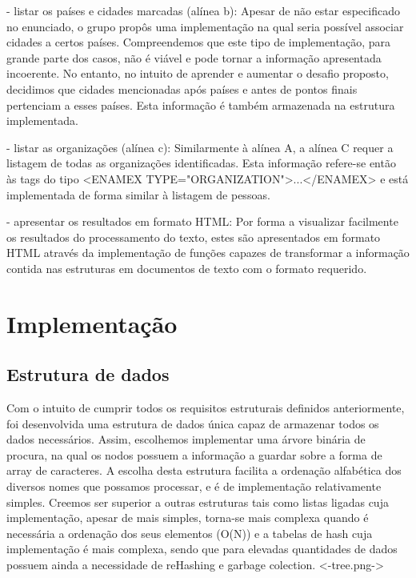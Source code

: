 - listar os países e cidades marcadas (alínea b):
	Apesar de não estar especificado no enunciado, o grupo propôs uma implementação na qual seria possível associar cidades a certos países. Compreendemos que este tipo de implementação, para grande parte dos casos, não é viável e pode tornar a informação apresentada incoerente. No entanto, no intuito de aprender e aumentar o desafio proposto, decidimos que cidades mencionadas após países e antes de pontos finais pertenciam a esses países. Esta informação é também armazenada na estrutura implementada.

- listar as organizações (alínea c):
	Similarmente à alínea A, a alínea C requer a listagem de todas as organizações identificadas. Esta informação refere-se então às tags do tipo <ENAMEX TYPE="ORGANIZATION">...</ENAMEX> e está implementada de forma similar à listagem de pessoas.

- apresentar os resultados em formato HTML:
	Por forma a visualizar facilmente os resultados do processamento do texto, estes são apresentados em formato HTML através da implementação de funções capazes de transformar a informação contida nas estruturas em documentos de texto com o formato requerido.

\section{Implementação}
\label{seq:enamex-imp}
\subsection{Estrutura de dados}
\label{seq:enamex-est}


Com o intuito de cumprir todos os requisitos estruturais definidos anteriormente, foi desenvolvida uma estrutura de dados única capaz de armazenar todos os dados necessários. Assim, escolhemos implementar uma árvore binária de procura, na qual os nodos possuem a informação a guardar sobre a forma de array de caracteres. A escolha desta estrutura facilita a ordenação alfabética dos diversos nomes que possamos processar, e é de implementação relativamente simples. Creemos ser superior a outras estruturas tais como listas ligadas cuja implementação, apesar de mais simples, torna-se mais complexa quando é necessária a ordenação dos seus elementos (O(N)) e a tabelas de hash cuja implementação é mais complexa, sendo que para elevadas quantidades de dados possuem ainda a necessidade de reHashing e garbage colection. 
<-tree.png->

